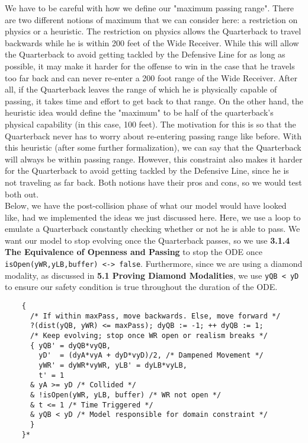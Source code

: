 We have to be careful with how we define our "maximum passing range". There are two different notions of maximum that we can consider here: a restriction on physics or a heuristic. The restriction on physics allows the Quarterback to travel backwards while he is within 200 feet of the Wide Receiver. While this will allow the Quarterback to avoid getting tackled by the Defensive Line for as long as possible, it may make it harder for the offense to win in the case that he travels too far back and can never re-enter a 200 foot range of the Wide Receiver. After all, if the Quarterback leaves the range of which he is physically capable of passing, it takes time and effort to get back to that range. On the other hand, the heuristic idea would define the "maximum" to be half of the quarterback's physical capability (in this case, 100 feet). The motivation for this is so that the Quarterback never has to worry about re-entering passing range like before. With this heuristic (after some further formalization), we can say that the Quarterback will always be within passing range. However, this constraint also makes it harder for the Quarterback to avoid getting tackled by the Defensive Line, since he is not traveling as far back. Both notions have their pros and cons, so we would test both out. \\

Below, we have the post-collision phase of what our model would have looked like, had we implemented the ideas we just discussed here. Here, we use a loop to emulate a Quarterback constantly checking whether or not he is able to pass. We want our model to stop evolving once the Quarterback passes, so we use \textbf{3.1.4 The Equivalence of Openness and Passing} to stop the ODE once \texttt{isOpen(yWR,yLB,buffer) <-> false}. Furthermore, since we are using a diamond modality, as discussed in \textbf{5.1 Proving Diamond Modalities}, we use \texttt{yQB < yD} to ensure our safety condition is true throughout the duration of the ODE.

\begin{lstlisting}
    {
      /* If within maxPass, move backwards. Else, move forward */
      ?(dist(yQB, yWR) <= maxPass); dyQB := -1; ++ dyQB := 1;
      /* Keep evolving; stop once WR open or realism breaks */
      { yQB' = dyQB*vyQB,
        yD'  = (dyA*vyA + dyD*vyD)/2, /* Dampened Movement */
        yWR' = dyWR*vyWR, yLB' = dyLB*vyLB,
        t' = 1
      & yA >= yD /* Collided */
      & !isOpen(yWR, yLB, buffer) /* WR not open */
      & t <= 1 /* Time Triggered */
      & yQB < yD /* Model responsible for domain constraint */
      }
    }*
\end{lstlisting}

